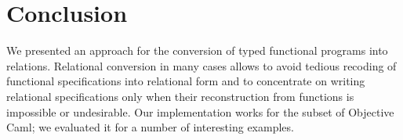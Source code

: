 \section{Conclusion}
\label{conclusion}

We presented an approach for the conversion of typed functional programs into relations. 
Relational conversion in many cases allows to avoid tedious recoding of functional specifications
into relational form and to concentrate on writing relational specifications only when their
reconstruction from functions is impossible or undesirable. Our implementation works for the
subset of Objective Caml; we evaluated it for a number of interesting examples.
